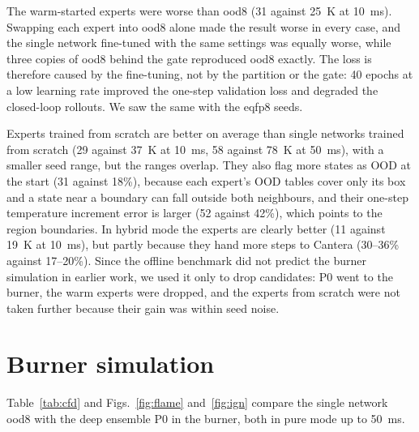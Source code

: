 \documentclass[preprint,review,12pt]{elsarticle}
\begin{document}
The warm-started experts were worse than ood8 (31 against 25~K at 10~ms). Swapping each expert into ood8
alone made the result worse in every case, and the single network fine-tuned with the same settings was
equally worse, while three copies of ood8 behind the gate reproduced ood8 exactly. The loss is therefore
caused by the fine-tuning, not by the partition or the gate: 40 epochs at a low learning rate improved
the one-step validation loss and degraded the closed-loop rollouts. We saw the same with the eqfp8 seeds.

Experts trained from scratch are better on average than single networks trained from scratch (29 against
37~K at 10~ms, 58 against 78~K at 50~ms), with a smaller seed range, but the ranges overlap. They also
flag more states as OOD at the start (31 against 18\%), because each expert's OOD tables cover only its
box and a state near a boundary can fall outside both neighbours, and their one-step temperature
increment error is larger (52 against 42\%), which points to the region boundaries. In hybrid mode the
experts are clearly better (11 against 19~K at 10~ms), but partly because they hand more steps to Cantera
(30--36\% against 17--20\%). Since the offline benchmark did not predict the burner simulation in earlier
work, we used it only to drop candidates: P0 went to the burner, the warm experts were dropped, and the
experts from scratch were not taken further because their gain was within seed noise.

\section{Burner simulation}
\label{sec:cfd}

Table~\ref{tab:cfd} and Figs.~\ref{fig:flame} and~\ref{fig:ign} compare the single network ood8 with the
deep ensemble P0 in the burner, both in pure mode up to 50~ms.
\end{document}
